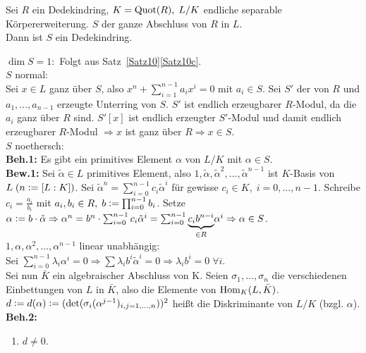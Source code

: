 \documentclass[a4paper, 10pt]{report}
\begin{document}
\begin{Satz} 
Sei $R$ ein Dedekindring, $K = \Quot{R}, \; L/K$ endliche separable
Körpererweiterung.
$S$ der ganze Abschluss von $R$ in $L$.\\
Dann ist $S$ ein Dedekindring.
\end{Satz}

\begin{Bew} 
$\dim S=1:$ Folgt aus Satz~\ref{Satz10}\ref{Satz10c}.\\
$S$ normal:\\
Sei $x\in L$ ganz über $S$, also $x^n+\sum_{i=1}^{n-1}a_i x^i = 0$ mit $a_i \in S$.
Sei $S'$ der von $R$ und $a_1,\dots,a_{n-1}$ erzeugte Unterring von $S$.
$S'$ ist endlich erzeugbarer $R$-Modul, da die $a_i$ ganz über $R$ sind.
$S'[x]$ ist endlich erzeugter $S'$-Modul und damit endlich erzeugbarer $R$-Modul $\Rightarrow x$ ist ganz über $R \Rightarrow x \in S$.\\
$S$ noethersch:\\
\textbf{Beh.1:} Es gibt ein primitives Element $\alpha$ von $L/K$ mit $\alpha \in S$.\\
\textbf{Bew.1:} Sei $\tilde{\alpha} \in L$ primitives Element, also $1, \tilde{\alpha}, \tilde{\alpha}^2, \dots, \tilde{\alpha}^{n-1}$ ist $K$-Basis von $L \; (n \mathrel{\mathop:}= [L:K])$.
Sei $\tilde{\alpha}^n = \sum_{i=0}^{n-1} c_i \tilde{\alpha}^i$ für gewisse $c_i \in K, \; i = 0, \dots, n-1$.
Schreibe $c_i = \frac{a_i}{b_i}$ mit $a_i, b_i \in R, \; b \mathrel{\mathop:}= \prod_{i=0}^{n-1} b_i$.
Setze $\alpha \mathrel{\mathop:}= b \cdot \tilde{\alpha} \Rightarrow \alpha^n = b^n \cdot
\sum_{i=0}^{n-1} c_i \tilde{\alpha}^i = \sum_{i=0}^{n-1} \underset{\in
R}{\underbrace{c_i b^{n-i}}}\alpha^i \Rightarrow \alpha \in S$.\\
$1, \alpha, \alpha^2, \dots, \alpha^{n-1}$ linear unabhängig:\\
Sei $\sum_{i=0}^{n-1} \lambda_i \alpha^i = 0 \Rightarrow \sum \lambda_i b^i
\tilde{\alpha}^i = 0 \Rightarrow \lambda_i b^i = 0 \; \forall i$.\\
Sei nun $\bar{K}$ ein algebraischer Abschluss von K.
Seien $\sigma_1, \dots, \sigma_n$ die verschiedenen Einbettungen von $L$ in
$\bar{K}$, also die Elemente von $\Hom[K]{L}{\bar{K}}$.\\
$d \mathrel{\mathop:}= d(\alpha) \mathrel{\mathop:}= (\det(\sigma_i(\alpha^{j-1})_{i,j=1, \dots, n}))^2$
heißt die Diskriminante von $L/K$ (bzgl. $\alpha$).\\
\textbf{Beh.2:}
\begin{enumerate} 
  \item $d \not= 0$.

\end{enumerate}
\end{Bew}
\end{document}
